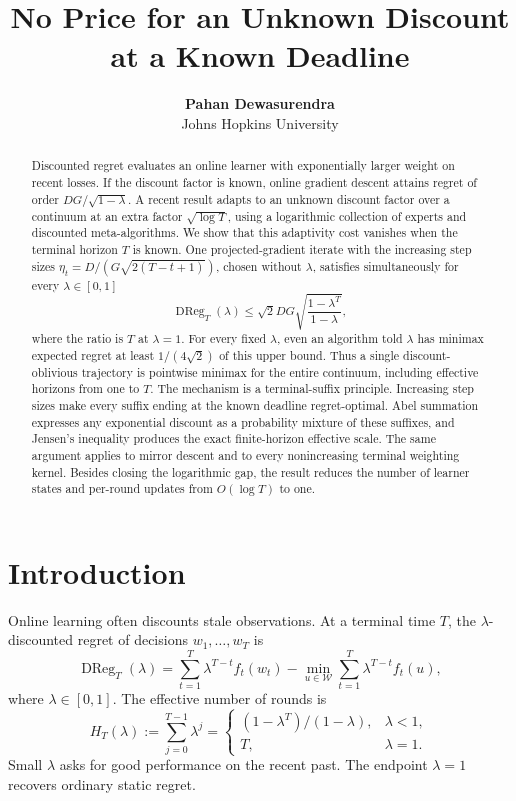 \documentclass{article}
\title{No Price for an Unknown Discount at a Known Deadline}
\author{\textbf{Pahan Dewasurendra} \\ Johns Hopkins University}
\newcommand{\W}{\mathcal W}
\newcommand{\DReg}{\operatorname{DReg}}
\begin{document}
\maketitle

\begin{abstract}
Discounted regret evaluates an online learner with exponentially larger weight on recent losses. If the discount factor is known, online gradient descent attains regret of order $DG/\sqrt{1-\lambda}$. A recent result adapts to an unknown discount factor over a continuum at an extra factor $\sqrt{\log T}$, using a logarithmic collection of experts and discounted meta-algorithms. We show that this adaptivity cost vanishes when the terminal horizon $T$ is known. One projected-gradient iterate with the increasing step sizes $\eta_t=D/(G\sqrt{2(T-t+1)})$, chosen without $\lambda$, satisfies simultaneously for every $\lambda\in[0,1]$ \[ \DReg_T(\lambda)\le \sqrt2DG\sqrt{\frac{1-\lambda^T}{1-\lambda}}, \] where the ratio is $T$ at $\lambda=1$. For every fixed $\lambda$, even an algorithm told $\lambda$ has minimax expected regret at least $1/(4\sqrt2)$ of this upper bound. Thus a single discount-oblivious trajectory is pointwise minimax for the entire continuum, including effective horizons from one to $T$. The mechanism is a terminal-suffix principle. Increasing step sizes make every suffix ending at the known deadline regret-optimal. Abel summation expresses any exponential discount as a probability mixture of these suffixes, and Jensen's inequality produces the exact finite-horizon effective scale. The same argument applies to mirror descent and to every nonincreasing terminal weighting kernel. Besides closing the logarithmic gap, the result reduces the number of learner states and per-round updates from $O(\log T)$ to one.
\end{abstract}

\section{Introduction}

Online learning often discounts stale observations. At a terminal time $T$, the $\lambda$-discounted regret of decisions $w_1,\ldots,w_T$ is
\begin{equation}
\DReg_T(\lambda)=\sum_{t=1}^T\lambda^{T-t}f_t(w_t)-\min_{u\in\W}\sum_{t=1}^T\lambda^{T-t}f_t(u),
\label{eq:dreg}
\end{equation}
where $\lambda\in[0,1]$. The effective number of rounds is
\begin{equation}
H_T(\lambda):=\sum_{j=0}^{T-1}\lambda^j=
\begin{cases}
(1-\lambda^T)/(1-\lambda),&\lambda<1,\\
T,&\lambda=1.
\end{cases}
\label{eq:effective}
\end{equation}
Small $\lambda$ asks for good performance on the recent past. The endpoint $\lambda=1$ recovers ordinary static regret.
\end{document}
